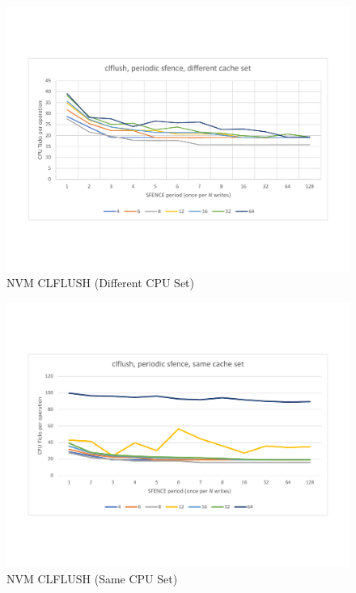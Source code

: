 \begin{figure}
    \centering
    \caption{NVM CLFLUSH (Different CPU Set)}\label{micro:clflush:different}
    \includegraphics[scale=0.35]{micro/nvm-clflush-periodic-different.pdf}
\end{figure}

\begin{figure}
    \centering
    \caption{NVM CLFLUSH (Same CPU Set)}\label{micro:clflush:same}
    \includegraphics[scale=0.35]{micro/nvm-clflush-periodic-same.pdf}
\end{figure}


